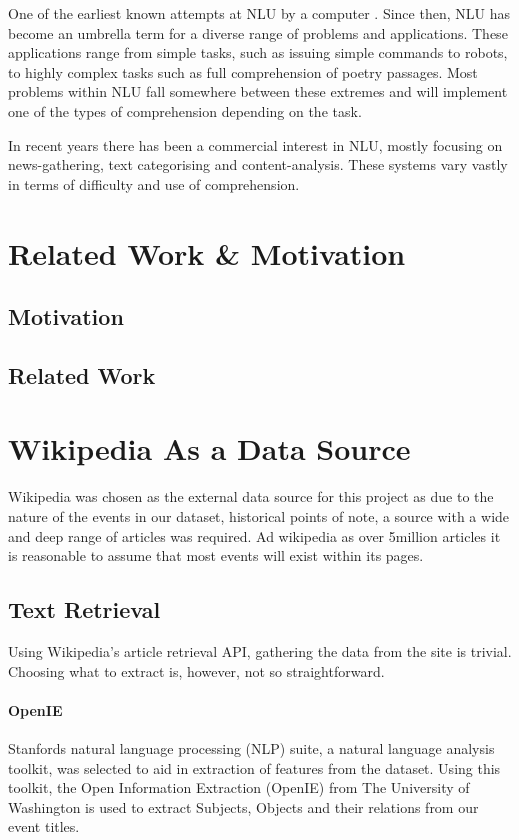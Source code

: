 \documentclass[bsc,frontabs,twoside,singlespacing,parskip,deptreport]{infthesis}     %
\begin{document}
One of the earliest known attempts at NLU by a computer \cite{russell1995modern}. Since then, NLU has become an
umbrella term for a diverse range of problems and applications. These applications range from simple tasks, such as
issuing simple commands to robots, to highly complex tasks such as full comprehension of poetry passages.
Most problems within NLU fall somewhere between these extremes and will implement one of the types of comprehension
depending on the task.

In recent years there has been a commercial interest in NLU, mostly focusing on news-gathering, text categorising and
content-analysis. These systems vary vastly in terms of difficulty and use of comprehension. 

\chapter{Related Work \& Motivation}
\section{Motivation}
\section{Related Work}


\chapter{Wikipedia As a Data Source}
Wikipedia was chosen as the external data source for this project as
due to the nature of the events in our dataset, historical points of note,
a source with a wide and deep range of articles was required.
Ad wikipedia as over 5million articles \cite{} it is reasonable to assume
that most events will exist within its pages.

\section{Text Retrieval}
Using Wikipedia's article retrieval API, gathering the data from
the site is trivial. Choosing what to extract is, however, not
so straightforward.
\subsubsection{OpenIE}
Stanfords natural language processing (NLP) suite,
a natural language analysis toolkit,
was selected to aid in extraction of features from the dataset.
Using this toolkit, the Open Information Extraction (OpenIE) from
The University of Washington is used to extract Subjects, Objects
and their relations from our event titles.
\end{document}
